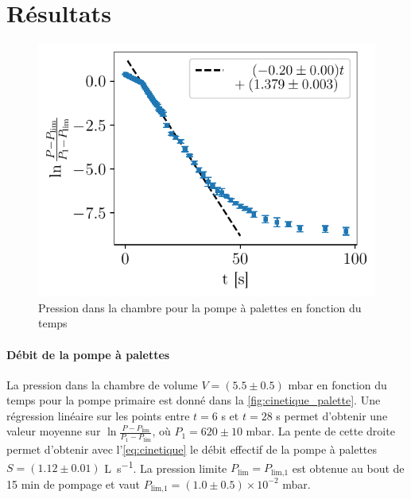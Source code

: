 \section{Résultats}


\begin{minipage}{\textwidth}
    \begin{figure}
        \centering
        \includegraphics[width=\linewidth]{figures/cinetique_palettes.pdf}
        \caption{Pression dans la chambre pour la pompe à palettes en fonction du temps}
        \label{fig:cinetique_palette}
    \end{figure}
    
    \paragraph*{Débit de la pompe à palettes}
    La pression dans la chambre de volume \(V = (5.5 \pm 0.5)\) \si{\milli\bar} en fonction du temps pour la pompe primaire est donné dans la \autoref{fig:cinetique_palette}. Une régression linéaire sur les points entre \(t = 6\) \si{\second} et \(t = 28\) \si{\second} permet d'obtenir une valeur moyenne sur \(\ln{\frac{P - P_\textrm{lim}}{P_1 - P_\textrm{lim}}}\), où \(P_1 = 620 \pm 10\) \si{\milli\bar}. La pente de cette droite permet d'obtenir avec l'\autoref{eq:cinetique} le débit effectif de la pompe à palettes \(S = (1.12 \pm 0.01)\) \si{\liter \per \second}. La pression limite \(P_\textrm{lim} = P_\textrm{lim,1}\) est obtenue au bout de 15 \si{\minute} de pompage et vaut \(P_\textrm{lim,1} = (1.0 \pm 0.5) \times 10^{-2}\) \si{\milli\bar}.
\end{minipage}

